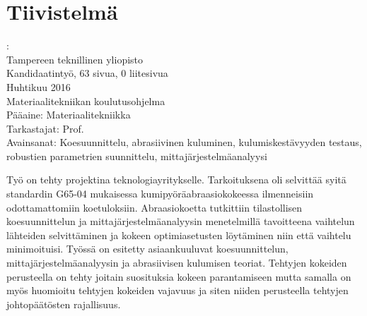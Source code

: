 \documentclass[12pt,a4paper,finnish]{tutthesis}
\begin{document}



\chapter*{Tiivistelmä}         %

\begin{spacing}{1.0}
         {\bf \textsf{\MakeUppercase{\@author}}}: \@title\\  %
         \textsf{Tampereen teknillinen yliopisto}\\
         \textsf{Kandidaatintyö, 63 sivua, 0 liitesivua}\\ %
         \textsf{Huhtikuu 2016}\\
         \textsf{Materiaalitekniikan koulutusohjelma}\\
         \textsf{Pääaine: Materiaalitekniikka}\\
         \textsf{Tarkastajat:  Prof. \@examiner}\\ %
         \textsf{Avainsanat: Koesuunnittelu, abrasiivinen kuluminen, kulumiskestävyyden testaus, robustien parametrien suunnittelu, mittajärjestelmäanalyysi}\\
\end{spacing}





Työ on tehty projektina teknologiayritykselle. Tarkoituksena oli selvittää syitä standardin
G65-04 mukaisessa kumipyöräabraasiokokeessa ilmenneisiin odottamattomiin koetuloksiin.
Abraasiokoetta tutkittiin tilastollisen koesuunnittelun ja mittajärjestelmäanalyysin
menetelmillä tavoitteena vaihtelun lähteiden selvittäminen ja kokeen optimiasetusten
löytäminen niin että vaihtelu minimoituisi. Työssä on esitetty asiaankuuluvat
koesuunnittelun, mittajärjestelmäanalyysin ja abrasiivisen kulumisen teoriat.
Tehtyjen kokeiden perusteella on tehty joitain suosituksia kokeen parantamiseen mutta
samalla on myös huomioitu tehtyjen kokeiden vajavuus ja siten niiden
perusteella tehtyjen johtopäätösten rajallisuus.
\end{document}
